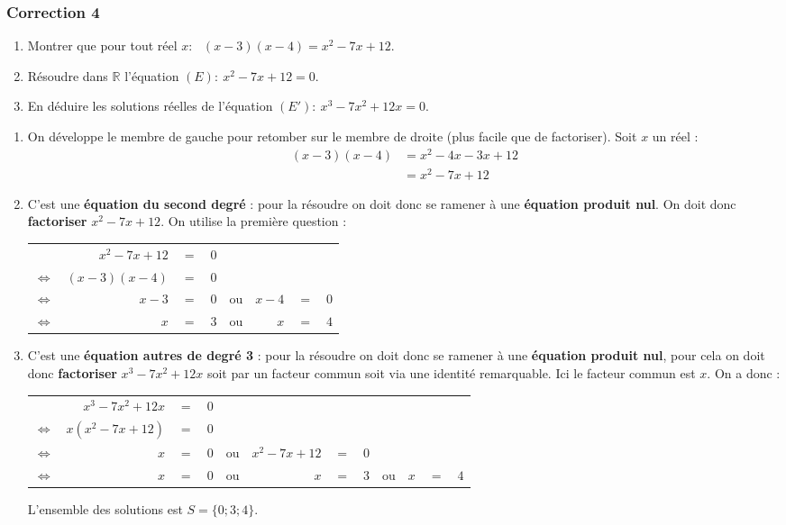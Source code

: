 \documentclass[15pt, mathserif]{beamer}
\newcommand{\R}{\mathbb{R}}			%
\newcommand{\ligneq}[2]{$\Longleftrightarrow$ & $#1$ & $=$ & $#2$ \\}
\newcommand{\Ligneq}[2]{ & $#1$ & $=$ & $#2$ \\}
\newenvironment{RPN}{\begin{center}\begin{tabular}{rrclcrcl}}{\end{tabular}\end{center}}
\newcommand{\lignerpn}[4]{$\Longleftrightarrow$ & $#1$ & $=$ & $#2$ & ou & $#3$ & $=$ & $#4$ \\}
\newenvironment{TRPN}{\begin{center}\begin{tabular}{rrclcrclcrcl}}{\end{tabular}\end{center}}
\newcommand{\lignetrpn}[6]{$\Longleftrightarrow$ & $#1$ & $=$ & $#2$ & ou & $#3$ & $=$ & $#4$ & ou & $#5$ & $=$ & $#6$ \\}
\begin{document}
\begin{frame}
\vspace{-10mm}
	\frametitle{Correction 4}
\begin{enumerate} 
 	 \item Montrer que pour tout réel $x$:~ $(x-3)(x-4)=x^2-7x+12$. 
 	 \item Résoudre dans $\R$ l'équation $(E):~x^2-7x+12= 0$. 
 	 \item En déduire les solutions réelles de l'équation $(E'):~x^3-7x^2+12x = 0$. 
 \end{enumerate} 
 
 \bigskip 
 \bigskip 
 \begin{enumerate} 
 	 \item On développe le membre de gauche pour retomber sur le membre de droite (plus facile que de factoriser). Soit $x$ un réel : 
 	 	 \begin{align*} 
 	 	 (x-3)(x-4)&=x^2-4x-3x+12 \\ 
 	 	 	 &=x^2-7x+12 
 	 \end{align*} 
 \end{enumerate} 
 \end{frame} 
 \begin{frame} 
 \begin{enumerate} \setcounter{enumi}{1}  
 	 \item C'est une \textbf{équation du second degré} : pour la résoudre on doit donc se ramener à une \textbf{équation produit nul}. On doit donc \textbf{factoriser} $x^2-7x+12$. On utilise la première question : 
 	 	  \begin{RPN} 
 	 	  	 \Ligneq{x^2-7x+12}{0} 
 	 	 	 \ligneq{(x-3)(x-4)}{0} 
 	 	 	 \lignerpn{x-3}{0}{x-4}{0} 
 	 	 	 \lignerpn{x}{3}{x}{4} 
 	 	  \end{RPN} 
 	 \item C'est une \textbf{équation autres de degré 3} : pour la résoudre on doit donc se ramener à une \textbf{équation produit nul}, pour cela on doit donc \textbf{factoriser} $x^3-7x^2+12x $ soit par un facteur commun soit via une identité remarquable. Ici le facteur commun est $x$. On a donc : 
 	 	 \begin{footnotesize} 
 \begin{TRPN} 
 	 	 	 \Ligneq{x^3-7x^2+12x}{0} 
 	 	 	 \ligneq{x(x^2-7x+12)}{0} 
 	 	 	 \lignerpn{x}{0}{x^2-7x+12}{0} 
 	 	 	 \lignetrpn{x}{0}{x}{3}{x}{4} 
 	 	 \end{TRPN} 
 \end{footnotesize} L'ensemble des solutions est $S=\{0;3;4\}$. 
 \end{enumerate} 
 
 \end{frame}
\end{document}
